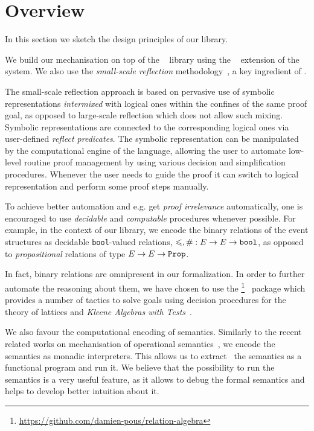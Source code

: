\section{Overview}

In this section we sketch the design principles of our library. 

We build our mechanisation on top of the \mathcomp~\cite{Mahboubi-Tassi:MATHCOMP17} library 
using the \ssreflect~\cite{Gonthier-al:SSR2016} extension of the \coq system.
We also use the \emph{small-scale reflection} 
methodology~\cite{Gonthier-Assia:SSR2010, Gonthier-al:SSR2016}, 
a key ingredient of \ssreflect. 

The small-scale reflection approach is based on 
pervasive use of symbolic representations \emph{intermixed}
with logical ones within the confines of the same proof goal,
as opposed to large-scale reflection which does not allow such mixing.
Symbolic representations are connected to the corresponding logical ones
via user-defined \emph{reflect predicates}.
The symbolic representation can be manipulated 
by the computational engine of the language, 
allowing the user to automate low-level routine 
proof management by using various decision 
and simplification procedures.
Whenever the user needs to guide the proof 
it can switch to logical representation
and perform some proof steps manually. 

To achieve better automation and e.g. get \emph{proof irrelevance}
automatically, one is encouraged
to use \emph{decidable} and \emph{computable} procedures
whenever possible.
For example, in the context of our library, 
we encode the binary relations of the event structures
as decidable \texttt{bool}-valued relations, 
\ie $\leqslant, \# : E \rightarrow E \rightarrow \texttt{bool}$,
as opposed to \emph{propositional} 
relations of type $E \rightarrow E \rightarrow \texttt{Prop}$. 

In fact, binary relations are omnipresent in our formalization.
In order to further automate the reasoning about them, 
we have chosen to use the \relationalgebra%
\footnote{\url{https://github.com/damien-pous/relation-algebra}}~%
\cite{Pous-ITP2013} package 
which provides a number of tactics to solve goals using
decision procedures for the theory of lattices  
and \emph{Kleene Algebras with Tests}~\cite{Kozen:TOPLAS:1997}.

We also favour the computational encoding of semantics. 
Similarly to the recent related works on mechanisation 
of operational semantics~\cite{Xia-al:POPL2019, Letan-al:CPP2020, Affeldt-al:ICMPC2019}, 
we encode the semantics as monadic interpreters.  
This allows us to extract~\cite{Letouzey:CCE2008} 
the semantics as a functional program and run it. 
We believe that the possibility to run the semantics 
is a very useful feature, as it allows 
to debug the formal semantics
and helps to develop better intuition about it.

